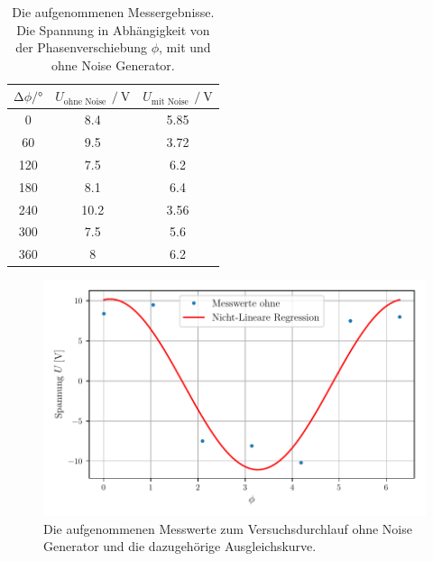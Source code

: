 \begin{table} 
  \centering
  \caption{Die aufgenommenen Messergebnisse. Die Spannung in Abhängigkeit von der Phasenverschiebung $\phi$, mit und ohne Noise Generator. } 
  \label{tab:data_ohne_mit}
  \begin{tabular}{S[table-format=3.0] S[table-format=2.1] S[table-format=1.2]}
    \toprule
    $\increment \phi /°$ & $U_\text{ohne Noise} \, \mathbin{/} \si{\volt}$ & $U_\text{mit Noise} \, \mathbin{/} \si{\volt}$ \\
        &   8.4   &  5.85  \\
    60   &   9.5   &  3.72  \\
    120  &   7.5   &  6.2   \\
    180  &   8.1   &  6.4   \\
    240  &   10.2  &  3.56  \\
    300  &   7.5   &  5.6   \\
    360  &   8     &  6.2   \\
    \bottomrule
  \end{tabular}
\end{table}

\begin{figure}
      \centering
      \includegraphics[width=\textwidth]{bilder/plot1.pdf}
      \caption{Die aufgenommenen Messwerte zum Versuchsdurchlauf ohne Noise Generator und die dazugehörige Ausgleichskurve.}
      \label{fig:ohne_noise}
\end{figure}

